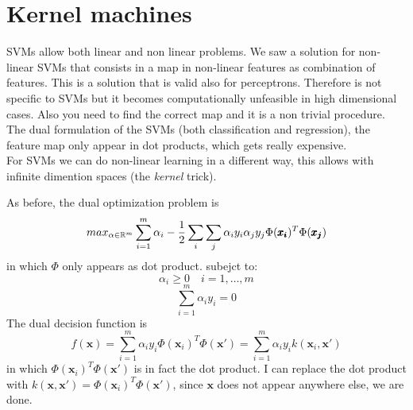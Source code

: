 \chapter{Kernel machines}
\label{cha:kernel_machines}

SVMs allow both linear and non linear problems. We saw a solution for non-linear SVMs that consists in a map in non-linear features as combination of features. This is a solution that is valid also for perceptrons. 
Therefore is not specific to SVMs but it becomes computationally unfeasible in high dimensional cases.
Also you need to find the correct map and it is a non trivial procedure.
The dual formulation of the SVMs (both classification and regression), the feature map only appear in dot products, which gets really expensive.\\

For SVMs we can do non-linear learning in a different way, this allows with infinite dimention spaces (the \textit{kernel} trick).\\


As before, the dual optimization problem is 
$$max_{\alpha \in \mathbb{R}^m}\sum_{i=1}^m \alpha_i - 
    \frac{1}{2} \sum_{i} \sum_{j} \alpha_i y_i \alpha_j y_j \Phi(\pmb{x_i}) ^T \Phi(\pmb{x_j}) $$
in which $\Phi$ only appears as dot product.
subejct to:
$$\alpha_i \geq 0 \quad i = 1, \dots, m$$
$$\sum_{i=1}^m \alpha_i y_i = 0$$
The dual decision function is
$$f(\pmb{x}) = \sum _{i=1} ^m \alpha_i y_i \Phi(\pmb{x}_i)^T \Phi(\pmb{x'}) = \sum _{i=1} ^m \alpha_i y_i k(\pmb{x}_i , \pmb{x'})$$
in which $\Phi(\pmb{x}_i)^T \Phi(\pmb{x'})$ is in fact the dot product. I can replace the dot product with $k(\pmb{x}, \pmb{x'}) = \Phi(\pmb{x}_i)^T \Phi(\pmb{x'})$, since $\pmb{x}$ does not appear anywhere else, we are done.\\


